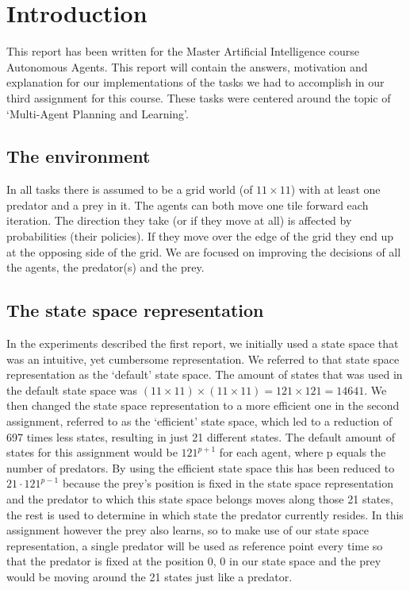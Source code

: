 
\section{Introduction}
This report has been written for the Master Artificial Intelligence course Autonomous Agents. This report will contain the answers, motivation and explanation for our implementations of the tasks we had to accomplish in our third assignment for this course. These tasks were centered around the topic of `Multi-Agent Planning and Learning'.

\subsection{The environment} \label{sec:environment}
In all tasks there is assumed to be a grid world (of $11 \times 11$) with at least one predator and a prey in it. The agents can both move one tile forward each iteration. The direction they take (or if they move at all) is affected by probabilities (their policies). If they move over the edge of the grid they end up at the opposing side of the grid. We are focused on improving the decisions of all the agents, the predator(s) and the prey. 

\subsection{The state space representation} \label{sec:stateSpace}
In the experiments described the first report, we initially used a state space that was an intuitive, yet cumbersome representation. We referred to that state space representation as the `default' state space. The amount of states that was used in the default state space was $(11 \times 11) \times (11 \times 11) = 121 \times 121 = 14641$. We then changed the state space representation to a more efficient one in the second assignment, referred to as the `efficient' state space, which led to a reduction of 697 times less states, resulting in just 21 different states.
The default amount of states for this assignment would be $121^{p+1}$ for each agent, where p equals the number of predators. By using the efficient state space this has been reduced to $21\cdot 121^{p-1}$ because the prey's position is fixed in the state space representation and the predator to which this state space belongs moves along those 21 states, the rest is used to determine in which state the predator currently resides. In this assignment however the prey also learns, so to make use of our state space representation, a single predator will be used as reference point every time so that the predator is fixed at the position 0, 0 in our state space and the prey would be moving around the 21 states just like a predator. 

